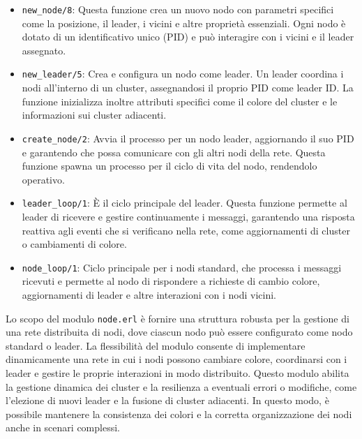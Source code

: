 \documentclass[12pt, a4paper]{report}
\begin{document}
\begin{itemize}
    \item \texttt{new\_node/8}: Questa funzione crea un nuovo nodo con parametri specifici come la posizione, il leader, i vicini e altre proprietà essenziali. Ogni nodo è dotato di un identificativo unico (PID) e può interagire con i vicini e il leader assegnato.

    \item \texttt{new\_leader/5}: Crea e configura un nodo come leader. Un leader coordina i nodi all'interno di un cluster, assegnandosi il proprio PID come leader ID. La funzione inizializza inoltre attributi specifici come il colore del cluster e le informazioni sui cluster adiacenti.

    \item \texttt{create\_node/2}: Avvia il processo per un nodo leader, aggiornando il suo PID e garantendo che possa comunicare con gli altri nodi della rete. Questa funzione spawna un processo per il ciclo di vita del nodo, rendendolo operativo.

    \item \texttt{leader\_loop/1}: È il ciclo principale del leader. Questa funzione permette al leader di ricevere e gestire continuamente i messaggi, garantendo una risposta reattiva agli eventi che si verificano nella rete, come aggiornamenti di cluster o cambiamenti di colore.

    \item \texttt{node\_loop/1}: Ciclo principale per i nodi standard, che processa i messaggi ricevuti e permette al nodo di rispondere a richieste di cambio colore, aggiornamenti di leader e altre interazioni con i nodi vicini.

\end{itemize}

\noindent
Lo scopo del modulo \texttt{node.erl} è fornire una struttura robusta per la gestione di una rete distribuita di nodi, dove ciascun nodo può essere configurato come nodo standard o leader. La flessibilità del modulo consente di implementare dinamicamente una rete in cui i nodi possono cambiare colore, coordinarsi con i leader e gestire le proprie interazioni in modo distribuito. Questo modulo abilita la gestione dinamica dei cluster e la resilienza a eventuali errori o modifiche, come l'elezione di nuovi leader e la fusione di cluster adiacenti. In questo modo, è possibile mantenere la consistenza dei colori e la corretta organizzazione dei nodi anche in scenari complessi.
\end{document}
